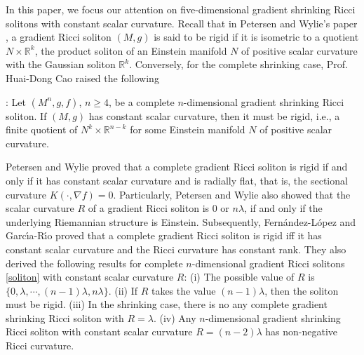 \documentclass[12pt]{amsart}
\begin{document}
	\smallskip	
	In this paper, we focus our attention on five-dimensional gradient shrinking Ricci solitons with constant scalar curvature. Recall that in Petersen and Wylie's paper \cite{Petersen-Wylie}, a gradient Ricci soliton $(M, g)$ is said to be rigid if it is isometric to a quotient $N \times \mathbb{R}^k$, the product soliton of an Einstein manifold $N$ of positive scalar curvature with the Gaussian soliton $\mathbb{R}^k$.
	Conversely, for the complete shrinking case, Prof. Huai-Dong Cao raised the following
	
	\smallskip	
	:
	Let $(M^n, g, f)$, $n\geq 4$, be a complete $n$-dimensional gradient shrinking Ricci soliton. If $(M, g)$ has constant scalar curvature, then it must be rigid,
	i.e., a finite quotient of ${N}^k\times \mathbb{R}^{n-k}$ for some Einstein manifold ${N}$ of positive scalar curvature.
	
	\smallskip	
	Petersen and Wylie \cite{Petersen-Wylie} proved that a complete gradient Ricci soliton is rigid if and only if it has
	constant scalar curvature and is radially flat, that is, the sectional curvature $K(\cdot, \nabla f)=0$.
	Particularly, Petersen and Wylie \cite{Petersen-Wylie} also showed that the scalar curvature $R$ of a gradient Ricci soliton is $0$ or $n\lambda$, if and only if the underlying Riemannian structure is Einstein.
	Subsequently, Fern\'{a}ndez-L\'{o}pez and Garc\'\i a-R\'\i o \cite{FR16} proved that
	a complete gradient Ricci soliton is rigid iff it has constant scalar curvature and the Ricci curvature has constant rank. They also derived the following results for complete $n$-dimensional gradient Ricci solitons \eqref{soliton} with constant scalar curvature $R$: (i) The possible value of $R$ is $\{0, \lambda, \cdots, (n-1)\lambda, n\lambda\}$. (ii) If $R$ takes the value $(n-1)\lambda$,  then the soliton must be rigid. (iii) In the shrinking case, there is  no any complete gradient shrinking Ricci soliton  with $R=\lambda$.
	(iv) Any $n$-dimensional gradient shrinking Ricci soliton with constant scalar curvature $R=(n-2)\lambda$ has non-negative Ricci curvature.
	
\end{document}
